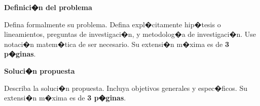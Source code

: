 \documentclass[12pt,a4paper]{article}
\begin{document}
\large{\textbf{Definici�n del problema}}

\vspace{1mm}

\normalsize

Defina formalmente su problema. Defina expl�citamente hip�tesis o lineamientos, preguntas de investigaci�n, y metodolog�a
de investigaci�n.  Use notaci�n matem�tica de ser
necesario. Su extensi�n m�xima es de \textbf{3 p�ginas}.

\vspace{1mm}

\large{\textbf{Soluci�n propuesta}}

\vspace{1mm}

\normalsize

Describa la soluci�n propuesta. Incluya objetivos generales y
espec�ficos. Su extensi�n m�xima es de \textbf{3 p�ginas}.




\end{document}

